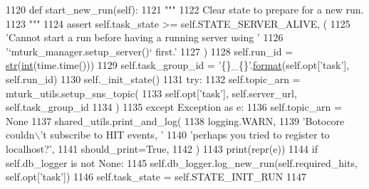 \begin{DoxyCode}
1120     \textcolor{keyword}{def }start\_new\_run(self):
1121         \textcolor{stringliteral}{"""}
1122 \textcolor{stringliteral}{        Clear state to prepare for a new run.}
1123 \textcolor{stringliteral}{        """}
1124         \textcolor{keyword}{assert} self.task\_state >= self.STATE\_SERVER\_ALIVE, (
1125             \textcolor{stringliteral}{'Cannot start a run before having a running server using '}
1126             \textcolor{stringliteral}{'`mturk\_manager.setup\_server()` first.'}
1127         )
1128         self.run\_id = \hyperlink{namespacegenerate__task__READMEs_a5b88452ffb87b78c8c85ececebafc09f}{str}(\hyperlink{namespacelanguage__model_1_1eval__ppl_a7d12ee00479673c5c8d1f6d01faa272a}{int}(time.time()))
1129         self.task\_group\_id = \textcolor{stringliteral}{'\{\}\_\{\}'}.\hyperlink{namespaceparlai_1_1chat__service_1_1services_1_1messenger_1_1shared__utils_a32e2e2022b824fbaf80c747160b52a76}{format}(self.opt[\textcolor{stringliteral}{'task'}], self.run\_id)
1130         self.\_init\_state()
1131         \textcolor{keywordflow}{try}:
1132             self.topic\_arn = mturk\_utils.setup\_sns\_topic(
1133                 self.opt[\textcolor{stringliteral}{'task'}], self.server\_url, self.task\_group\_id
1134             )
1135         \textcolor{keywordflow}{except} Exception \textcolor{keyword}{as} e:
1136             self.topic\_arn = \textcolor{keywordtype}{None}
1137             shared\_utils.print\_and\_log(
1138                 logging.WARN,
1139                 \textcolor{stringliteral}{'Botocore couldn\(\backslash\)'t subscribe to HIT events, '}
1140                 \textcolor{stringliteral}{'perhaps you tried to register to localhost?'},
1141                 should\_print=\textcolor{keyword}{True},
1142             )
1143             print(repr(e))
1144         \textcolor{keywordflow}{if} self.db\_logger \textcolor{keywordflow}{is} \textcolor{keywordflow}{not} \textcolor{keywordtype}{None}:
1145             self.db\_logger.log\_new\_run(self.required\_hits, self.opt[\textcolor{stringliteral}{'task'}])
1146         self.task\_state = self.STATE\_INIT\_RUN
1147 
\end{DoxyCode}
\mbox{\label{classparlai_1_1mturk_1_1core_1_1legacy__2018_1_1mturk__manager_1_1MTurkManager_a201aff5240479a785e32e52de1c374f8}} 
